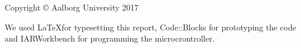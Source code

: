 \thispagestyle{empty}
{\small
\strut\vfill %
\noindent Copyright \copyright{} Aalborg University 2017\par
\vspace{0.2cm}
\noindent We used \LaTeX for typesetting this report,
Code::Blocks for prototyping the code
and IARWorkbench for programming the microcrontroller.
}
\clearpage